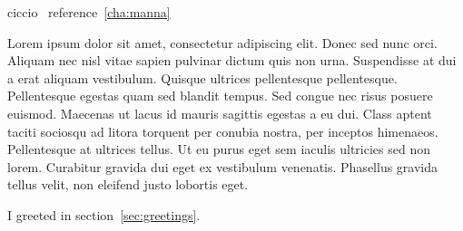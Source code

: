 ciccio~\label{cha:manna}
reference~\ref{cha:manna}

Lorem ipsum dolor sit amet, consectetur adipiscing elit. Donec sed nunc orci. Aliquam nec nisl vitae sapien pulvinar dictum quis non urna. Suspendisse at dui a erat aliquam vestibulum. Quisque ultrices pellentesque pellentesque. Pellentesque egestas quam sed blandit tempus. Sed congue nec risus posuere euismod. Maecenas ut lacus id mauris sagittis egestas a eu dui. Class aptent taciti sociosqu ad litora torquent per conubia nostra, per inceptos himenaeos. Pellentesque at ultrices tellus. Ut eu purus eget sem iaculis ultricies sed non lorem. Curabitur gravida dui eget ex vestibulum venenatis. Phasellus gravida tellus velit, non eleifend justo lobortis eget. 


I greeted in section~\ref{sec:greetings}.